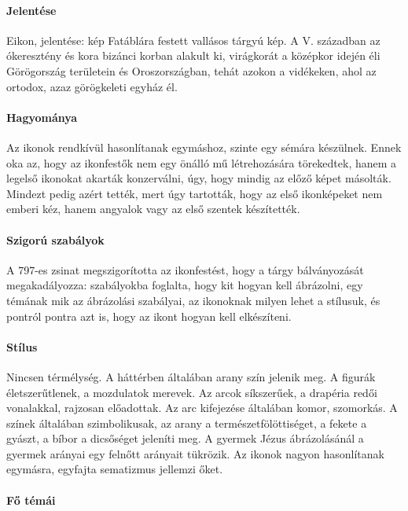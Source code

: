 \paragraph{Jelentése}
Eikon, jelentése: kép
Fatáblára festett vallásos tárgyú kép. A V. században az ókeresztény és kora bizánci korban alakult ki, virágkorát a középkor idején éli Görögország területein és Oroszországban, tehát azokon a vidékeken, ahol az ortodox, azaz görögkeleti egyház él.

\paragraph{Hagyománya}
Az ikonok rendkívül hasonlítanak egymáshoz, szinte egy sémára készülnek. Ennek oka az, hogy az ikonfestők nem egy önálló mű létrehozására törekedtek, hanem a legelső ikonokat akarták konzerválni, úgy, hogy mindig az előző képet másolták. Mindezt pedig azért tették, mert úgy tartották, hogy az első ikonképeket nem emberi kéz, hanem angyalok vagy az első szentek készítették.

\paragraph{Szigorú szabályok}
A 797-es zsinat megszigorította az ikonfestést, hogy a tárgy bálványozását megakadályozza: szabályokba foglalta, hogy kit hogyan kell ábrázolni, egy témának mik az ábrázolási szabályai, az ikonoknak milyen lehet a stílusuk, és pontról pontra azt is, hogy az ikont hogyan kell elkészíteni.

\paragraph{Stílus}
Nincsen térmélység. A háttérben általában arany szín jelenik meg.
A figurák életszerűtlenek, a mozdulatok merevek. Az arcok
síkszerűek, a drapéria redői vonalakkal, rajzosan előadottak.
Az arc kifejezése általában komor, szomorkás. A színek általában
szimbolikusak, az arany a természetfölöttiséget, a fekete a gyászt,
a bíbor a dicsőséget jeleníti meg. A gyermek Jézus ábrázolásánál
a gyermek arányai egy felnőtt arányait tükrözik. Az ikonok nagyon
hasonlítanak egymásra, egyfajta sematizmus jellemzi őket.

\paragraph{Fő témái}

